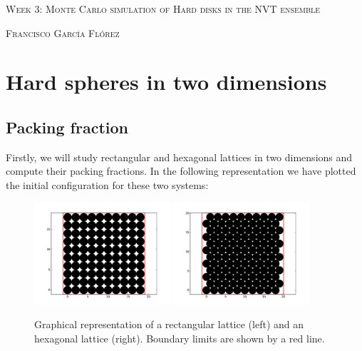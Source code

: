 \documentclass[10 pt]{article}
\begin{document}

\begin{center}
  \Large \textsc{Week 3: Monte Carlo simulation of Hard disks in the NVT ensemble}
\end{center}

\begin{center}
  \large \textsc{Francisco García Flórez}
\end{center}

\section{Hard spheres in two dimensions}

\subsection{Packing fraction}

Firstly, we will study rectangular and hexagonal lattices in two dimensions and compute their packing fractions. In the following representation we have plotted the initial configuration for these two systems:

\begin{figure}[H]
  \begin{center}
    \includegraphics[width=0.45\textwidth]{../graphs/rectangular.pdf}
    \includegraphics[width=0.45\textwidth]{../graphs/hexagonal.pdf}
    \caption{Graphical representation of a rectangular lattice (left) and an hexagonal lattice (right). Boundary limits are shown by a red line.}
  \end{center}
\end{figure}
\end{document}
